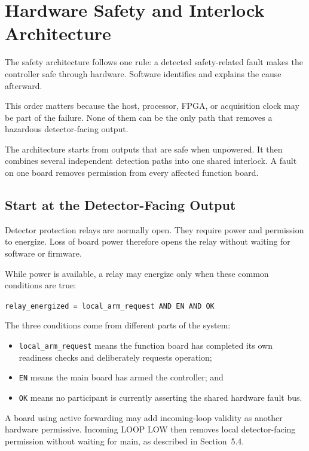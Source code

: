 \chapter{Hardware Safety and Interlock Architecture}
\label{chap:safety}

The safety architecture follows one rule: a detected safety-related fault makes the controller safe through hardware. Software identifies and explains the cause afterward.

This order matters because the host, processor, FPGA, or acquisition clock may be part of the failure. None of them can be the only path that removes a hazardous detector-facing output.

The architecture starts from outputs that are safe when unpowered. It then combines several independent detection paths into one shared interlock. A fault on one board removes permission from every affected function board.

\section{Start at the Detector-Facing Output}

Detector protection relays are normally open. They require power and permission to energize. Loss of board power therefore opens the relay without waiting for software or firmware.

While power is available, a relay may energize only when these common conditions are true:

\begin{center}
\texttt{relay\_energized = local\_arm\_request AND EN AND OK}
\end{center}

The three conditions come from different parts of the system:

\begin{itemize}
  \item \texttt{local\_arm\_request} means the function board has completed its own readiness checks and deliberately requests operation;
  \item \texttt{EN} means the main board has armed the controller; and
  \item \texttt{OK} means no participant is currently asserting the shared hardware fault bus.
\end{itemize}

A board using active forwarding may add incoming-loop validity as another hardware permissive. Incoming LOOP LOW then removes local detector-facing permission without waiting for main, as described in Section~5.4.

